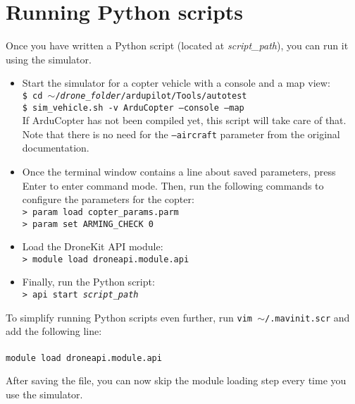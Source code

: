 \documentclass{article}
\begin{document}
\section*{Running Python scripts}
Once you have written a Python script (located at \emph{script\_path}), you can run it using the simulator.

\begin{itemize}
    \item Start the simulator for a copter vehicle with a console and a map view: \\
          {\tt \$ cd $\sim$/\emph{drone\_folder}/ardupilot/Tools/autotest} \\
          {\tt \$ sim\_vehicle.sh -v ArduCopter --console --map} \\
          If ArduCopter has not been compiled yet, this script will take care of that. Note that there is
          no need for the {\tt --aircraft} parameter from the original documentation.
    \item Once the terminal window contains a line about saved parameters, press Enter to enter command mode.
          Then, run the following commands to configure the parameters for the copter: \\
          {\tt > param load copter\_params.parm} \\
          {\tt > param set ARMING\_CHECK 0}
    \item Load the DroneKit API module: \\
          {\tt > module load droneapi.module.api}
    \item Finally, run the Python script: \\
          {\tt > api start \emph{script\_path}}
\end{itemize}

\vspace{0.4cm}

To simplify running Python scripts even further, run {\tt vim $\sim$/.mavinit.scr} and add the following line: \\\\
{\tt module load droneapi.module.api}

After saving the file, you can now skip the module loading step every time you use the simulator.
\end{document}

